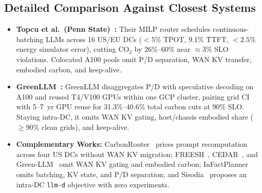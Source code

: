 \subsection{Detailed Comparison Against Closest Systems}\label{subsec:closest_comparison}
\begin{itemize}
    \item \textbf{Topcu et al.\ (Penn State)~\cite{topcu2026tension}:} Their MILP router schedules continuous-batching LLMs across 16 US/EU DCs ($<5\%$ TPOT, 9.1\% TTFT, $<2.5\%$ energy simulator error), cutting $\text{CO}_2$ by 26\%--60\% near $\approx 3\%$ SLO violations. Colocated A100 pools omit P/D separation, WAN KV transfer, embodied carbon, and keep-alive.
    \item \textbf{GreenLLM~\cite{shi2024greenllm}:} GreenLLM disaggregates P/D with speculative decoding on A100 and reused T4/V100 GPUs within one GCP cluster, pairing grid CI with 5--7~yr GPU reuse for 31.3\%--40.6\% total carbon cuts at 90\% SLO. Staying intra-DC, it omits WAN KV gating, host/chassis embodied share ($\ge 90\%$ clean grids), and keep-alive.
    \item \textbf{Complementary Works:} CarbonRouter~\cite{zhang2026context} prices prompt recomputation across four US DCs without WAN KV migration; FREESH~\cite{he2025freesh}, CEDAR~\cite{more2026cedar}, and Green-LLM~\cite{cheng2026greenllm} omit WAN KV gating and embodied carbon; InFactPlanner~\cite{tsiopani2026infactplanner} omits batching, KV state, and P/D separation; and Sisodia~\cite{sisodia2026sicp} proposes an intra-DC \texttt{llm-d} objective with zero experiments.
\end{itemize}
